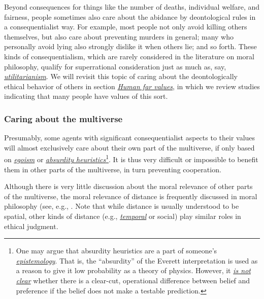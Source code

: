 Beyond consequences for things like the number of deaths, individual
welfare, and fairness, people sometimes also care about the abidance by
deontological rules in a consequentialist way. For example, most people
not only avoid killing others themselves, but also care about preventing
murders in general; many who personally avoid lying also strongly
dislike it when others lie; and so forth. These kinds of
consequentialism, which are rarely considered in the literature on moral
philosophy, qualify for superrational consideration just as much as,
say,
\href{https://en.wikipedia.org/wiki/Utilitarianism}{\emph{utilitarianism}}.
We will revisit this topic of caring about the deontologically ethical
behavior of others in section
\protect\hyperlink{human-far-values}{\emph{Human far values}}, in
which we review studies indicating that many people have values of this
sort.

\hypertarget{caring-about-the-multiverse}{\subsubsection{Caring about
the multiverse}\label{caring-about-the-multiverse}}

Presumably, some agents with significant consequentialist aspects to
their values will almost exclusively care about their own part of the
multiverse, if only based on
\href{https://en.wikipedia.org/wiki/Ethical_egoism}{\emph{egoism}} or
\href{https://wiki.lesswrong.com/wiki/Absurdity_heuristic}{\emph{absurdity
heuristics}}\footnote{One may argue that absurdity heuristics are a part
  of someone's
  \href{https://en.wikipedia.org/wiki/Epistemology}{\emph{epistemology}}.
  That is, the ``absurdity'' of the Everett interpretation is used as a
  reason to give it low probability as a theory of physics. However, it
  \href{http://reducing-suffering.org/why-does-physics-exist/\#My_new_understanding}{\emph{is
  not clear}} whether there is a clear-cut, operational difference
  between belief and preference if the belief does not make a testable
  prediction.}. It is thus very difficult or impossible to benefit them
in other parts of the multiverse, in turn preventing cooperation.

Although there is very little discussion about the moral relevance of
other parts of the multiverse, the moral relevance of distance is
frequently discussed in moral philosophy (see, e.g.,
\parencite{Brock2013-cv}. Note that while distance is
usually understood to be spatial, other kinds of distance (e.g.,
\href{https://sentience-politics.org/philosophy/the-importance-of-the-future/}{\emph{temporal}}
\parencite{Beckstead2013-lv} or social) play similar roles
in ethical judgment.

